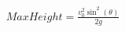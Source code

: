 \documentclass[preview]{standalone}
\begin{document}
\begin{align*}
Max Height = \frac{v_0^2 \sin^2(\theta)}{2g}
\end{align*}
\end{document}
